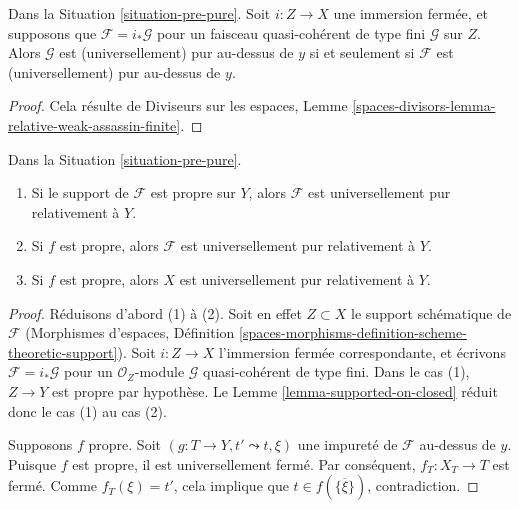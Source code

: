 \begin{lemma}
\label{lemma-supported-on-closed}
Dans la Situation \ref{situation-pre-pure}. Soit $i : Z \to X$ une immersion fermée,
et supposons que $\mathcal{F} = i_*\mathcal{G}$ pour un faisceau
quasi-cohérent de type fini $\mathcal{G}$ sur $Z$.
Alors $\mathcal{G}$ est (universellement) pur au-dessus de $y$
si et seulement si $\mathcal{F}$ est (universellement) pur au-dessus de $y$.
\end{lemma}

\begin{proof}
Cela résulte de Diviseurs sur les espaces, Lemme
\ref{spaces-divisors-lemma-relative-weak-assassin-finite}.
\end{proof}

\begin{lemma}
\label{lemma-proper-pure}
Dans la Situation \ref{situation-pre-pure}.
\begin{enumerate}
\item Si le support de $\mathcal{F}$ est propre sur $Y$, alors
$\mathcal{F}$ est universellement pur relativement à $Y$.
\item Si $f$ est propre, alors
$\mathcal{F}$ est universellement pur relativement à $Y$.
\item Si $f$ est propre, alors $X$ est universellement pur relativement à $Y$.
\end{enumerate}
\end{lemma}

\begin{proof}
Réduisons d'abord (1) à (2). Soit en effet $Z \subset X$ le
support schématique de $\mathcal{F}$
(Morphismes d'espaces, Définition
\ref{spaces-morphisms-definition-scheme-theoretic-support}). Soit $i : Z \to X$
l'immersion fermée correspondante, et écrivons
$\mathcal{F} = i_*\mathcal{G}$ pour un $\mathcal{O}_Z$-module $\mathcal{G}$
quasi-cohérent de type fini.
Dans le cas (1), $Z \to Y$ est propre par hypothèse.
Le Lemme \ref{lemma-supported-on-closed} réduit donc le cas (1) au cas (2).

\medskip\noindent
Supposons $f$ propre.
Soit $(g : T \to Y, t' \leadsto t, \xi)$ une impureté de $\mathcal{F}$
au-dessus de $y$. Puisque $f$ est propre, il est universellement fermé. Par conséquent,
$f_T : X_T \to T$ est fermé. Comme $f_T(\xi) = t'$, cela implique que
$t \in f(\overline{\{\xi\}})$, contradiction.
\end{proof}







